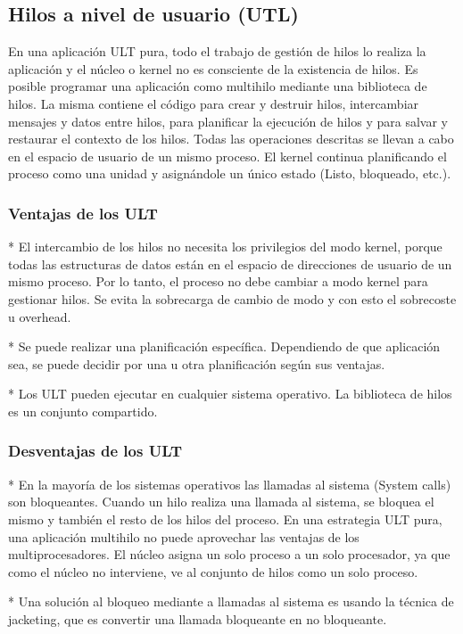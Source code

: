 \documentclass{article}
\begin{document}
\subsection{Hilos a nivel de usuario (UTL)}
\par
En una aplicación ULT pura, todo el trabajo de gestión de hilos lo realiza la aplicación y el núcleo o kernel no es consciente de la existencia de hilos. Es posible programar una aplicación como multihilo mediante una biblioteca de hilos. La misma contiene el código para crear y destruir hilos, intercambiar mensajes y datos entre hilos, para planificar la ejecución de hilos y para salvar y restaurar el contexto de los hilos. Todas las operaciones descritas se llevan a cabo en el espacio de usuario de un mismo proceso. El kernel continua planificando el proceso como una unidad y asignándole un único estado (Listo, bloqueado, etc.).
\par
\subsubsection{Ventajas de los ULT}
* El intercambio de los hilos no necesita los privilegios del modo kernel, porque todas las estructuras de datos están en el espacio de direcciones de usuario de un mismo proceso. Por lo tanto, el proceso no debe cambiar a modo kernel para gestionar hilos. Se evita la sobrecarga de cambio de modo y con esto el sobrecoste u overhead.
\par
* Se puede realizar una planificación específica. Dependiendo de que aplicación sea, se puede decidir por una u otra planificación según sus ventajas.
\par
* Los ULT pueden ejecutar en cualquier sistema operativo. La biblioteca de hilos es un conjunto compartido.

\subsubsection{Desventajas de los ULT}
* En la mayoría de los sistemas operativos las llamadas al sistema (System calls) son bloqueantes. Cuando un hilo realiza una llamada al sistema, se bloquea el mismo y también el resto de los hilos del proceso. En una estrategia ULT pura, una aplicación multihilo no puede aprovechar las ventajas de los multiprocesadores. El núcleo asigna un solo proceso a un solo procesador, ya que como el núcleo no interviene, ve al conjunto de hilos como un solo proceso.
\par
* Una solución al bloqueo mediante a llamadas al sistema es usando la técnica de jacketing, que es convertir una llamada bloqueante en no bloqueante. 
\par
\end{document}
